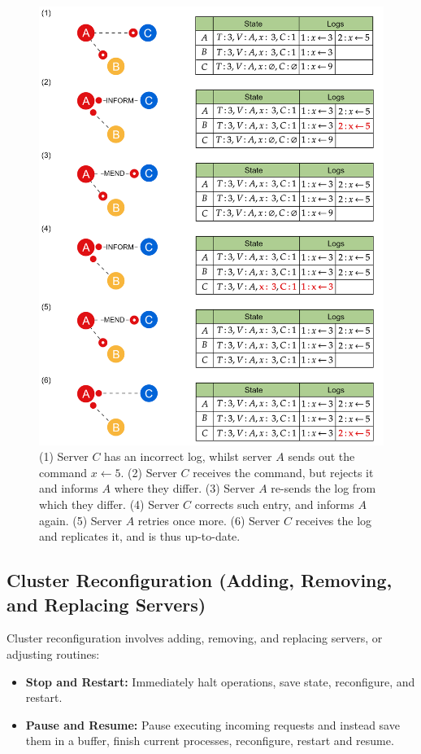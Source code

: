 \begin{figure}[ht!]
    \centering
    \includegraphics[width=.869\textwidth]{Sections/raft/logs_2.png}
    \caption{(1) Server $C$ has an incorrect log, whilst server $A$ sends out the command $x\leftarrow 5$. (2) Server $C$ receives the command, but rejects it and informs $A$ where they differ. (3) Server $A$ re-sends the log from which they differ. 
    (4) Server $C$ corrects such entry, and informs $A$ again. (5) Server $A$ retries once more. (6) Server $C$ receives the log and replicates it, and is thus up-to-date.}
\end{figure}

\newpage
\subsection{Cluster Reconfiguration (Adding, Removing, and Replacing Servers)}
\noindent
Cluster reconfiguration involves adding, removing, and replacing servers, or adjusting routines:

\begin{Def}

    \begin{itemize}
        \item \textbf{Stop and Restart:} Immediately halt operations, save state, reconfigure, and restart.
        \item \textbf{Pause and Resume:} Pause executing incoming requests and instead save them in a buffer, finish current processes,
        reconfigure, restart and resume. 
    \end{itemize}
\end{Def}

